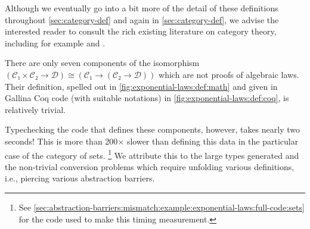Although we eventually go into a bit more of the detail of these definitions throughout \autoref{sec:category-def} and again in \autoref{sec:category-def}, we advise the interested reader to consult the rich existing literature on category theory, including for example \textcite{awodey2010category} and \textcite{mac1998categories}.

There are only seven components of the isomorphism $(\mathcal C₁ × \mathcal C₂ → \mathcal D) ≅ (\mathcal C₁ → (\mathcal C₂ → \mathcal D))$ which are not proofs of algebraic laws.
Their definition, spelled out in \autoref{fig:exponential-laws:def:math} and given in Gallina Coq code (with suitable notations) in \autoref{fig:exponential-laws:def:coq}, is relatively trivial.

Typechecking the code that defines these components, however, takes nearly two seconds!
This is more than 200$\times$ slower than defining this data in the particular case of the category of sets.%
\footnote{%
  See \autoref{sec:abstraction-barriers:mismatch:example:exponential-laws:full-code:sets} for the code used to make this timing measurement.%
}
We attribute this to the large types generated and the non-trivial conversion problems which require unfolding various definitions, i.e., piercing various abstraction barriers.

